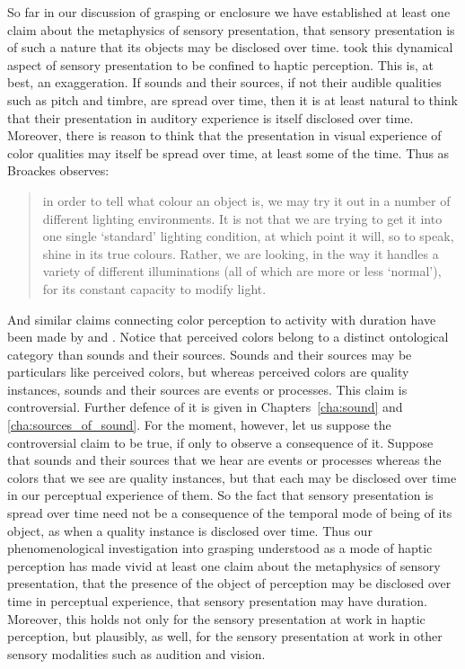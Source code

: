 So far in our discussion of grasping or enclosure we have established at least one claim about the metaphysics of sensory presentation, that sensory presentation is of such a nature that its objects may be disclosed over time. \citet{Broad:1952kx} took this dynamical aspect of sensory presentation to be confined to haptic perception. This is, at best, an exaggeration. If sounds and their sources, if not their audible qualities such as pitch and timbre, are spread over time, then it is at least natural to think that their presentation in auditory experience is itself disclosed over time. Moreover, there is reason to think that the presentation in visual experience of color qualities may itself be spread over time, at least some of the time. Thus as Broackes observes: 
\begin{quote}
	in order to tell what colour an object is, we may try it out in a number of different lighting environments. It is not that we are trying to get it into one single `standard' lighting condition, at which point it will, so to speak, shine in its true colours. Rather, we are looking, in the way it handles a variety of different illuminations (all of which are more or less `normal'), for its constant capacity to modify light. \citep[215]{Broackes:1997pa}
\end{quote}
And similar claims connecting color perception to activity with duration have been made by \citet{Noe:2004fk} and \citet{Matthen:2005md}. Notice that perceived colors belong to a distinct ontological category than sounds and their sources. Sounds and their sources may be particulars like perceived colors, but whereas perceived colors are quality instances, sounds and their sources are events or processes. This claim is controversial. Further defence of it is given in Chapters~\ref{cha:sound} and \ref{cha:sources_of_sound}. For the moment, however, let us suppose the controversial claim to be true, if only to observe a consequence of it. Suppose that sounds and their sources that we hear are events or processes whereas the colors that we see are quality instances, but that each may be disclosed over time in our perceptual experience of them. So the fact that sensory presentation is spread over time need not be a consequence of the temporal mode of being of its object, as when a quality instance is disclosed over time. Thus our phenomenological investigation into grasping understood as a mode of haptic perception has made vivid at least one claim about the metaphysics of sensory presentation, that the presence of the object of perception may be disclosed over time in perceptual experience, that sensory presentation may have duration. Moreover, this holds not only for the sensory presentation at work in haptic perception, but plausibly, as well, for the sensory presentation at work in other sensory modalities such as audition and vision.

